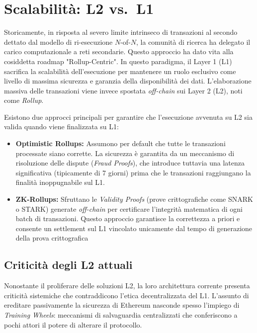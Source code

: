 \documentclass[12pt,a4paper,openright,twoside]{report}
\begin{document}
\section{Scalabilità: L2 vs.\ L1}

Storicamente, in risposta al severo limite intrinseco di transazioni al secondo dettato dal modello di ri-esecuzione $N$-of-$N$, la comunità di ricerca ha delegato il carico computazionale a reti secondarie. Questo approccio ha dato vita alla cosiddetta roadmap "Rollup-Centric". In questo paradigma, il Layer 1 (L1) sacrifica la scalabilità dell'esecuzione per mantenere un ruolo esclusivo come livello di massima sicurezza e garanzia della disponibilità dei dati. L'elaborazione massiva delle transazioni viene invece spostata \textit{off-chain} sui Layer 2 (L2), noti come \textit{Rollup}.

Esistono due approcci principali per garantire che l'esecuzione avvenuta su L2 sia valida quando viene finalizzata su L1:
\begin{itemize}
  \item \textbf{Optimistic Rollups:} Assumono per default che tutte le transazioni processate siano corrette. La sicurezza è garantita da un meccanismo di risoluzione delle dispute (\textit{Fraud Proofs}), che introduce tuttavia una latenza significativa (tipicamente di 7 giorni) prima che le transazioni raggiungano la finalità inoppugnabile sul L1.
  \item \textbf{ZK-Rollups:} Sfruttano le \textit{Validity Proofs} (prove crittografiche come SNARK o STARK) generate \textit{off-chain} per certificare l'integrità matematica di ogni batch di transazioni. Questo approccio garantisce la correttezza a priori e consente un settlement sul L1 vincolato unicamente dal tempo di generazione della prova crittografica
\end{itemize}

\subsection{Criticità degli L2 attuali}

Nonostante il proliferare delle soluzioni L2, la loro architettura corrente presenta criticità sistemiche che contraddicono l'etica decentralizzata del L1. L'assunto di ereditare passivamente la sicurezza di Ethereum nasconde spesso l'impiego di \textit{Training Wheels}: meccanismi di salvaguardia centralizzati che conferiscono a pochi attori il potere di alterare il protocollo.
\end{document}
